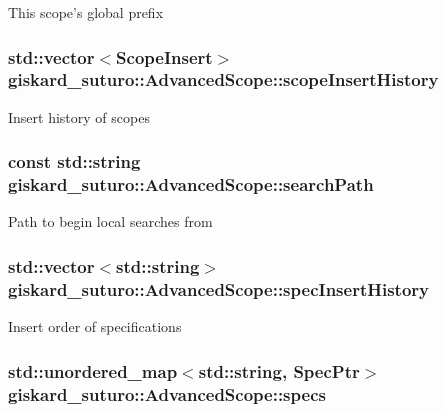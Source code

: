 This scope's global prefix \hypertarget{classgiskard__suturo_1_1AdvancedScope_af5081ec45e81c905ed286da7a72532c3}{
\subsubsection[{scope\-Insert\-History}]{\setlength{\rightskip}{0pt plus 5cm}std\-::vector$<${\bf Scope\-Insert}$>$ giskard\-\_\-suturo\-::\-Advanced\-Scope\-::scope\-Insert\-History\hspace{0.3cm}{\ttfamily [protected]}}}\label{classgiskard__suturo_1_1AdvancedScope_af5081ec45e81c905ed286da7a72532c3}
Insert history of scopes \hypertarget{classgiskard__suturo_1_1AdvancedScope_a10d0cc3f9602ef2bca32dd44bc49e30e}{
\subsubsection[{search\-Path}]{\setlength{\rightskip}{0pt plus 5cm}const std\-::string giskard\-\_\-suturo\-::\-Advanced\-Scope\-::search\-Path}}\label{classgiskard__suturo_1_1AdvancedScope_a10d0cc3f9602ef2bca32dd44bc49e30e}
Path to begin local searches from \hypertarget{classgiskard__suturo_1_1AdvancedScope_a6a788662a6c7df9eaa3a8419b466990d}{
\subsubsection[{spec\-Insert\-History}]{\setlength{\rightskip}{0pt plus 5cm}std\-::vector$<$std\-::string$>$ giskard\-\_\-suturo\-::\-Advanced\-Scope\-::spec\-Insert\-History\hspace{0.3cm}{\ttfamily [protected]}}}\label{classgiskard__suturo_1_1AdvancedScope_a6a788662a6c7df9eaa3a8419b466990d}
Insert order of specifications \hypertarget{classgiskard__suturo_1_1AdvancedScope_a92bbb9dc2613a1331a95f7e0310dd342}{
\subsubsection[{specs}]{\setlength{\rightskip}{0pt plus 5cm}std\-::unordered\-\_\-map$<$std\-::string, Spec\-Ptr$>$ giskard\-\_\-suturo\-::\-Advanced\-Scope\-::specs\hspace{0.3cm}{\ttfamily [private]}}}\label{classgiskard__suturo_1_1AdvancedScope_a92bbb9dc2613a1331a95f7e0310dd342}
